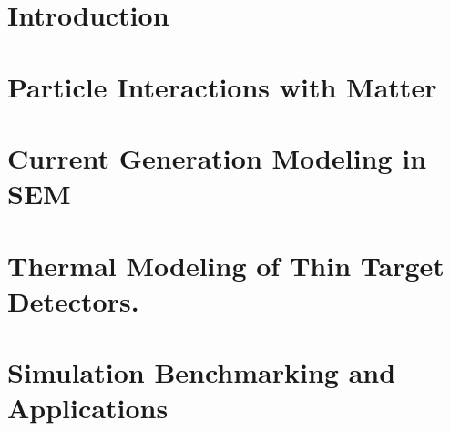 \documentclass[12pt,twoside,openright]{report}
\begin{document}


\pagestyle{plain}



\chapter{Introduction} 
\label{ch:Introduction}


\chapter{Particle Interactions with Matter} 
\label{ch:BeamMatterInter}


\chapter{Current Generation Modeling in SEM}
\label{ch:CurrentModeling}


\chapter{Thermal Modeling of Thin Target Detectors.}
\label{ch:TempModeling}


\chapter{Simulation Benchmarking and Applications}
\label{ch:ThermoMeasur}


% 

% 

% 

% 


\printbibliography 
\end{document}
